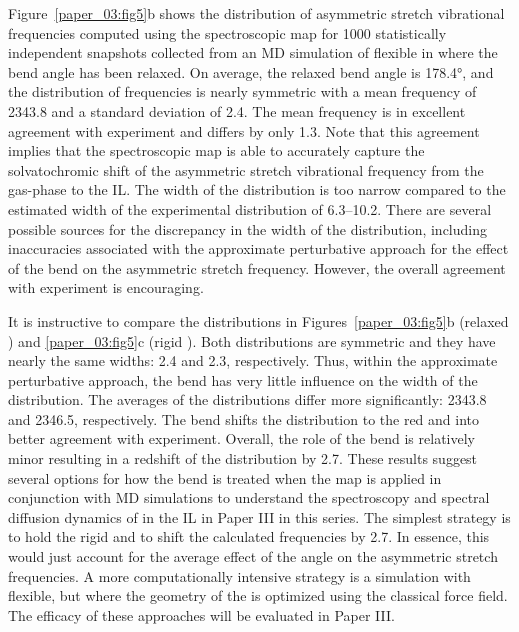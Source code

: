 Figure~\ref{paper_03:fig5}b shows the distribution of  asymmetric stretch vibrational frequencies computed using the spectroscopic map for \num{1000} statistically independent snapshots collected from an MD simulation of flexible  in \ce{[C4C1im][PF6]} where the  bend angle has been relaxed. On average, the relaxed bend angle is \ang{178.4}, and the distribution of frequencies is nearly symmetric with a mean frequency of \SI{2343.8}{\wavenumber} and a standard deviation of \SI{2.4}{\wavenumber}. The mean frequency is in excellent agreement with experiment and differs by only \SI{1.3}{\wavenumber}. Note that this agreement implies that the spectroscopic map is able to accurately capture the solvatochromic shift of the  asymmetric stretch vibrational frequency from the gas-phase to the \ce{[C4C1im][PF6]} IL. The width of the distribution is too narrow compared to the estimated width of the experimental distribution of \SIrange{6.3}{10.2}{\wavenumber}. There are several possible sources for the discrepancy in the width of the distribution, including inaccuracies associated with the approximate perturbative approach for the effect of the bend on the asymmetric stretch frequency. However, the overall agreement with experiment is encouraging.

It is instructive to compare the distributions in Figures~\ref{paper_03:fig5}b (relaxed ) and \ref{paper_03:fig5}c (rigid ). Both distributions are symmetric and they have nearly the same widths: \SI{2.4}{\wavenumber} and \SI{2.3}{\wavenumber}, respectively. Thus, within the approximate perturbative approach, the bend has very little influence on the width of the distribution. The averages of the distributions differ more significantly: \SI{2343.8}{\wavenumber} and \SI{2346.5}{\wavenumber}, respectively. The bend shifts the distribution to the red and into better agreement with experiment. Overall, the role of the bend is relatively minor resulting in a redshift of the distribution by \SI{2.7}{\wavenumber}. These results suggest several options for how the bend is treated when the map is applied in conjunction with MD simulations to understand the spectroscopy and spectral diffusion dynamics of  in the \ce{[C4C1im][PF6]} IL in Paper III in this series. The simplest strategy is to hold the  rigid and to shift the calculated frequencies by \SI{2.7}{\wavenumber}. In essence, this would just account for the average effect of the  angle on the asymmetric stretch frequencies. A more computationally intensive strategy is a simulation with  flexible, but where the geometry of the  is optimized using the classical force field. The efficacy of these approaches will be evaluated in Paper III.

